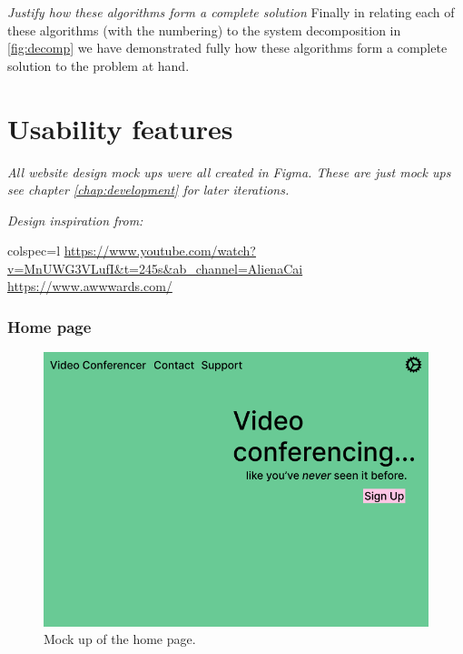 \textit{Justify how these algorithms form a complete solution}
Finally in relating each of these algorithms (with the 
numbering) to the system decomposition in \ref{fig:decomp}
we have demonstrated fully how these algorithms form a 
complete solution to the problem at hand.


\section{Usability features}

\textit{All website design mock ups were all created in
Figma. These are just mock ups see chapter \ref{chap:development}
for later iterations.}\\ \vspace{0.1cm}

\textit{Design inspiration from:}\\

\begin{tblr}{colspec={l}}
  \url{https://www.youtube.com/watch?v=MnUWG3VLufI&t=245s&ab_channel=AlienaCai}\\
  \url{https://www.awwwards.com/}\\
\end{tblr}

\subsubsection{Home page}

\begin{figure}[H]
\centering

\includegraphics[scale=0.2]{Images/HomeUI_1.png}

\caption{Mock up of the home page.}
\label{fig:ui1}
\end{figure}

